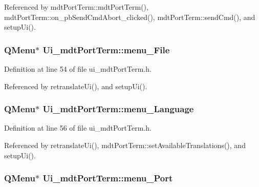 Referenced by mdt\-Port\-Term\-::mdt\-Port\-Term(), mdt\-Port\-Term\-::on\-\_\-pb\-Send\-Cmd\-Abort\-\_\-clicked(), mdt\-Port\-Term\-::send\-Cmd(), and setup\-Ui().

\hypertarget{class_ui__mdt_port_term_af4ff950d4030c0c2f203546caaa3a45f}{
\subsubsection[{menu\-\_\-\-File}]{\setlength{\rightskip}{0pt plus 5cm}Q\-Menu$\ast$ Ui\-\_\-mdt\-Port\-Term\-::menu\-\_\-\-File}}\label{class_ui__mdt_port_term_af4ff950d4030c0c2f203546caaa3a45f}


Definition at line 54 of file ui\-\_\-mdt\-Port\-Term.\-h.



Referenced by retranslate\-Ui(), and setup\-Ui().

\hypertarget{class_ui__mdt_port_term_a76b28956d67d1b795842eac918dadb49}{
\subsubsection[{menu\-\_\-\-Language}]{\setlength{\rightskip}{0pt plus 5cm}Q\-Menu$\ast$ Ui\-\_\-mdt\-Port\-Term\-::menu\-\_\-\-Language}}\label{class_ui__mdt_port_term_a76b28956d67d1b795842eac918dadb49}


Definition at line 56 of file ui\-\_\-mdt\-Port\-Term.\-h.



Referenced by retranslate\-Ui(), mdt\-Port\-Term\-::set\-Available\-Translations(), and setup\-Ui().

\hypertarget{class_ui__mdt_port_term_a432f9e70278ef43133af282fba27092f}{
\subsubsection[{menu\-\_\-\-Port}]{\setlength{\rightskip}{0pt plus 5cm}Q\-Menu$\ast$ Ui\-\_\-mdt\-Port\-Term\-::menu\-\_\-\-Port}}\label{class_ui__mdt_port_term_a432f9e70278ef43133af282fba27092f}


